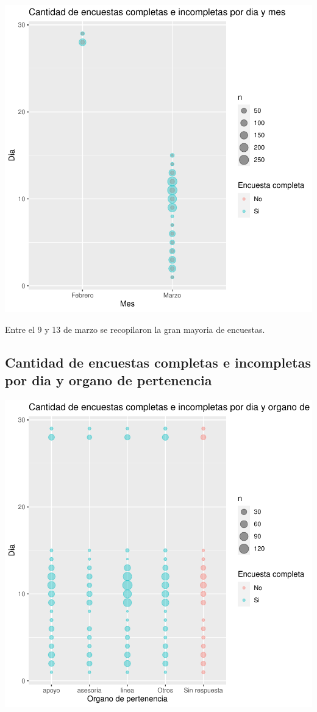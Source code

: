 \documentclass{article}
\begin{document}
\includegraphics{seguimientov3-046}

Entre el 9 y 13 de marzo se recopilaron la gran mayoria de encuestas.

\subsection{Cantidad de encuestas completas e incompletas por dia y organo de pertenencia}

\includegraphics{seguimientov3-047}
\end{document}
